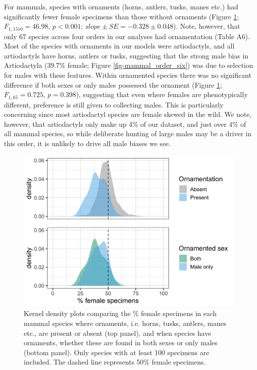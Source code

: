 \documentclass[a4paper, 12pt]{article}
\begin{document}
For mammals, species with ornaments (horns, antlers, tusks, manes etc.) had significantly fewer female specimens than those without ornaments (Figure \ref{fig-orn}; $F_{1, 1510} = 46.98$, $p < 0.001$; $slope \pm SE = -0.328 \pm 0.048$). 
Note, however, that only 67 species across four orders in our analyses had ornamentation (Table A6).
Most of the species with ornaments in our models were artiodactyls, and all artiodactyls have horns, antlers or tusks, suggesting that the strong male bias in Artiodactyla (39.7\% female; Figure \ref{fig-mammal_order_six}) was due to selection for males with these features. 
Within ornamented species there was no significant difference if both sexes or only males possessed the ornament (Figure \ref{fig-orn}; $F_{1, 65} = 0.725$, $p = 0.398$), suggesting that even where females are phenotypically different, preference is still given to collecting males. 
This is particularly concerning since most artiodactyl species are female skewed in the wild\cite{berger1999sex}. 
We note, however, that artiodactyls only make up 4\% of our dataset, and just over 4\% of all mammal species\cite{wilson2005mammal}, so while deliberate hunting of large males may be a driver in this order, it is unlikely to drive all male biases we see.

\begin{figure}
 \centering
  \includegraphics[width = \linewidth]{figures/ornamentation.png}
  \caption{Kernel density plots comparing the \% female specimens in each mammal species where ornaments, i.e. horns, tusks, antlers, manes etc., are present or absent (top panel), and when species have ornaments, whether these are found in both sexes or only males (bottom panel). 
  Only species with at least 100 specimens are included. 
  The dashed line represents 50\% female specimens. 
}
  \label{fig-orn}
\end{figure}
\end{document}
